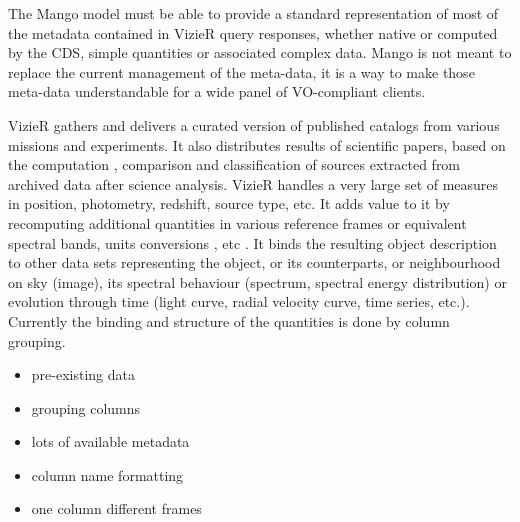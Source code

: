 The Mango model must be able to provide a standard representation of most of the metadata contained in VizieR query responses, whether native or computed  by the CDS, simple quantities or associated complex data.
Mango is not meant to replace the current management of the meta-data, it is a way to make those meta-data understandable for a wide panel of VO-compliant clients.

%
%
%
%


VizieR gathers and delivers a curated version of published catalogs from various missions and experiments.
It also distributes results of scientific papers, based on the computation , comparison and classification of sources extracted from archived data after science analysis.
VizieR handles a very large set of measures in position, photometry, redshift, source type, etc.
It adds value to it by recomputing additional quantities in various reference frames or equivalent spectral bands, units conversions , etc .
It binds the resulting object description to other data sets representing the object, or its counterparts, or neighbourhood on sky (image), its spectral behaviour (spectrum, spectral energy distribution) or evolution through time (light curve, radial velocity curve, time series, etc.).
Currently the binding and structure of the quantities is done by column grouping.
\begin{itemize}
    \item pre-existing data
    \item grouping columns
    \item lots of available metadata
    \item column name formatting
    \item one column different frames
\end{itemize}
